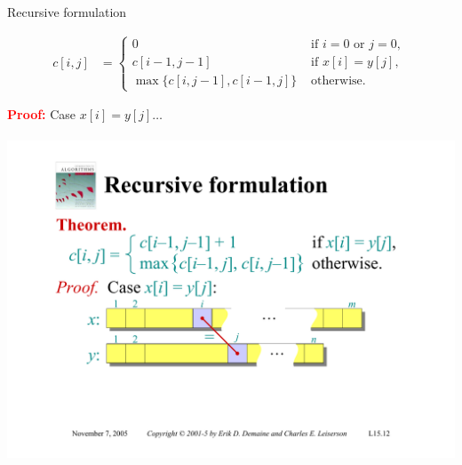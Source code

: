 \documentclass{beamer}
\begin{document}
\begin{frame}{Recursive formulation}
    \begin{tcolorbox}[title=Theorem]
        \begin{equation*}
            \begin{align*}
                c[i, j] &=
                            \begin{cases}
                                0 & \text{ if } i = 0 \text{ or } j = 0 \text{, } \\
                                c[i - 1, j - 1] & \text{ if } x[i] = y[j] \text{, } \\
                                \max \{ c[i, j - 1], c[i - 1, j] \} & \text{ otherwise.}
                            \end{cases}
            \end{align*}
        \end{equation*}
    \end{tcolorbox}
    \textcolor{red}{\textbf{Proof:}} Case $x[i] = y[j] \ldots$ \\
    \\
    \includegraphics[width=\textwidth,trim=3cm 5cm 3cm 10.50cm, clip]{figures/proof01.pdf}
\end{frame}
\end{document}
